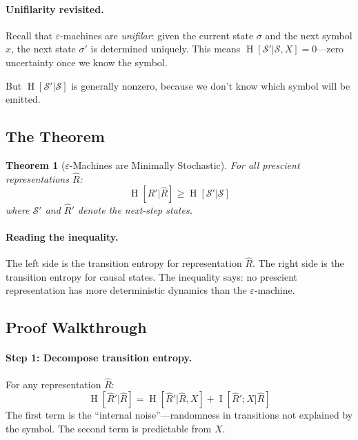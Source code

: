 \documentclass[11pt,a4paper]{article}
\theoremstyle{definition}
\theoremstyle{plain}
\newtheorem{theorem}{Theorem}[section]
\newcommand{\eps}{\varepsilon}
\newcommand{\calS}{\mathcal{S}}
\DeclareMathOperator{\Ent}{H}
\DeclareMathOperator{\MI}{I}
\begin{document}
\paragraph{Unifilarity revisited.} Recall that $\eps$-machines are \emph{unifilar}: given the current state $\sigma$ and the next symbol $x$, the next state $\sigma'$ is determined uniquely. This means $\Ent[\calS' | \calS, X] = 0$---zero uncertainty once we know the symbol.

But $\Ent[\calS' | \calS]$ is generally nonzero, because we don't know which symbol will be emitted.

\subsection{The Theorem}

\begin{theorembox}[title=Theorem 4: Minimal Stochasticity~\cite{shalizi2001computational}]
\begin{theorem}[$\eps$-Machines are Minimally Stochastic]
\label{thm:stochasticity}
For all prescient representations $\hat{R}$:
\begin{equation}
    \Ent[\hat{R}' | \hat{R}] \geq \Ent[\calS' | \calS]
\end{equation}
where $\calS'$ and $\hat{R}'$ denote the next-step states.
\end{theorem}
\end{theorembox}

\paragraph{Reading the inequality.} The left side is the transition entropy for representation $\hat{R}$. The right side is the transition entropy for causal states. The inequality says: no prescient representation has more deterministic dynamics than the $\eps$-machine.

\subsection{Proof Walkthrough}

\paragraph{Step 1: Decompose transition entropy.}
For any representation $\hat{R}$:
\begin{equation}
    \Ent[\hat{R}' | \hat{R}] = \Ent[\hat{R}' | \hat{R}, X] + \MI[\hat{R}'; X | \hat{R}]
\end{equation}
The first term is the ``internal noise''---randomness in transitions not explained by the symbol. The second term is predictable from $X$.
\end{document}

